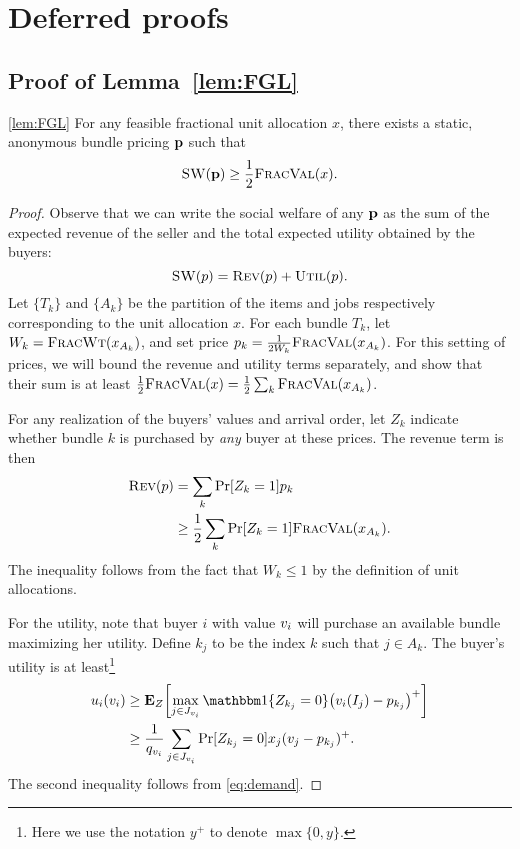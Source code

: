 \section{Deferred proofs}
\label{sec:deferred}

\subsection{Proof of Lemma~\ref{lem:FGL}}

\begin{numberedlemma}{\ref{lem:FGL}}
   For any feasible fractional unit allocation $x$, there exists a static,
    anonymous bundle pricing $\mathbf{p}$ such that
    \[
        {\normalfont\textsc{SW}}(\mathbf{p}) \ge \frac12 {\normalfont\textsc{FracVal}}(x).
    \]
\end{numberedlemma}
\begin{proof}
    Observe that we can write the social welfare of any $\mathbf{p}$ as
    the sum of the expected revenue of the seller and the total
    expected utility obtained by the buyers:
    \[
        \sw(\price) = \rev(\price) + \util(\price).
    \]
    Let $\{T_k\}$ and $\{A_k\}$ be the partition of the items and jobs
    respectively corresponding to the unit allocation $x$. For each
    bundle $T_k$, let $W_k = {\normalfont\textsc{FracWt}}(x_{A_k})$, and set price
    $\pricek = \frac1{2W_k}\fval(x_{A_k})$. For this setting of
    prices, we will bound the revenue and utility terms separately,
    and show that their sum is at least
    $\frac12{\normalfont\textsc{FracVal}}(x) = \frac12\sum_{k}{\normalfont\textsc{FracVal}}(x_{A_k})$.

    For any realization of the buyers' values and arrival order, let $Z_k$
    indicate whether bundle $k$ is purchased by {\em any} buyer at these
    prices.  The revenue term is then
    \begin{align}
        \rev(\price)  &= \sum_{k}\Pr[Z_k=1]\pricek \nonumber \\
            &\ge \half\sum_{k}\Pr[Z_k=1]\fval(x_{A_k}). \label{eq:rev}
    \end{align}
    The inequality follows from the fact that $W_k \le 1$ by the
    definition of unit allocations.
    
    For the utility, note that buyer $i$ with value $v_{i}$ will purchase an
    available bundle maximizing her utility. Define $k_j$ to be the index $k$
    such that $j \in A_k$. The buyer's utility is at
    least\footnote{Here we use the notation $y^+$ to denote $\max\{0,y\}$.}
    \begin{align}
        u_i(\vali) &\ge \expect[Z]{\max_{j\in\Jvi} \indicate\{Z_{k_j}=0\}
                \big(\vali(\intj) - \price[k_j]\big)^+} \nonumber \\
            &\ge \frac1{\qvi}\sum_{j\in\Jvi} \Pr[Z_{k_j}=0]\xj(\vj -
                \price[k_j])^+. \label{eq:vali-util}
    \end{align}
    The second inequality follows from \eqref{eq:demand}.


\end{proof}

